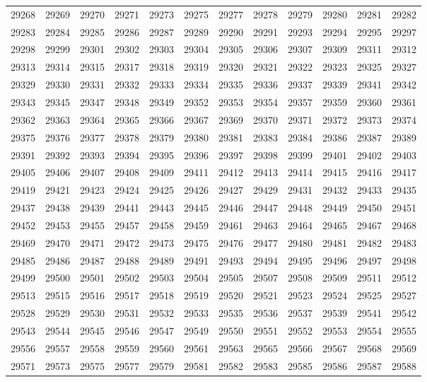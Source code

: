 \begin{center}
\begin{longtable}{llllllllllll}
29268 &29269 &29270 &29271 &29273 &29275 &29277 &29278 &29279 &29280 &29281 &29282 \\
29283 &29284 &29285 &29286 &29287 &29289 &29290 &29291 &29293 &29294 &29295 &29297 \\
29298 &29299 &29301 &29302 &29303 &29304 &29305 &29306 &29307 &29309 &29311 &29312 \\
29313 &29314 &29315 &29317 &29318 &29319 &29320 &29321 &29322 &29323 &29325 &29327 \\
29329 &29330 &29331 &29332 &29333 &29334 &29335 &29336 &29337 &29339 &29341 &29342 \\
29343 &29345 &29347 &29348 &29349 &29352 &29353 &29354 &29357 &29359 &29360 &29361 \\
29362 &29363 &29364 &29365 &29366 &29367 &29369 &29370 &29371 &29372 &29373 &29374 \\
29375 &29376 &29377 &29378 &29379 &29380 &29381 &29383 &29384 &29386 &29387 &29389 \\
29391 &29392 &29393 &29394 &29395 &29396 &29397 &29398 &29399 &29401 &29402 &29403 \\
29405 &29406 &29407 &29408 &29409 &29411 &29412 &29413 &29414 &29415 &29416 &29417 \\
29419 &29421 &29423 &29424 &29425 &29426 &29427 &29429 &29431 &29432 &29433 &29435 \\
29437 &29438 &29439 &29441 &29443 &29445 &29446 &29447 &29448 &29449 &29450 &29451 \\
29452 &29453 &29455 &29457 &29458 &29459 &29461 &29463 &29464 &29465 &29467 &29468 \\
29469 &29470 &29471 &29472 &29473 &29475 &29476 &29477 &29480 &29481 &29482 &29483 \\
29485 &29486 &29487 &29488 &29489 &29491 &29493 &29494 &29495 &29496 &29497 &29498 \\
29499 &29500 &29501 &29502 &29503 &29504 &29505 &29507 &29508 &29509 &29511 &29512 \\
29513 &29515 &29516 &29517 &29518 &29519 &29520 &29521 &29523 &29524 &29525 &29527 \\
29528 &29529 &29530 &29531 &29532 &29533 &29535 &29536 &29537 &29539 &29541 &29542 \\
29543 &29544 &29545 &29546 &29547 &29549 &29550 &29551 &29552 &29553 &29554 &29555 \\
29556 &29557 &29558 &29559 &29560 &29561 &29563 &29565 &29566 &29567 &29568 &29569 \\
29571 &29573 &29575 &29577 &29579 &29581 &29582 &29583 &29585 &29586 &29587 &29588 \\

\end{longtable}
\end{center}
